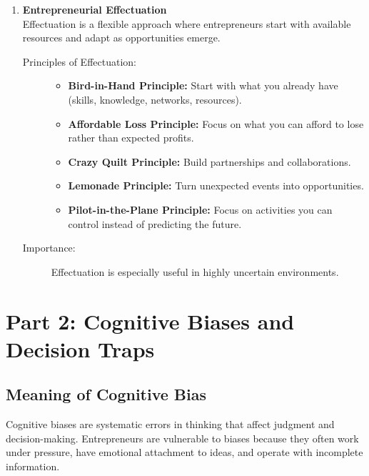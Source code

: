 \documentclass[12pt,a4paper]{article}
\begin{document}
\begin{enumerate}
    \item \textbf{Entrepreneurial Effectuation} \\
    Effectuation is a flexible approach where entrepreneurs start with available resources and adapt as opportunities emerge.
    \begin{description}
        \item[Principles of Effectuation:]
        \begin{itemize}
            \item \textbf{Bird-in-Hand Principle:} Start with what you already have (skills, knowledge, networks, resources).
            \item \textbf{Affordable Loss Principle:} Focus on what you can afford to lose rather than expected profits.
            \item \textbf{Crazy Quilt Principle:} Build partnerships and collaborations.
            \item \textbf{Lemonade Principle:} Turn unexpected events into opportunities.
            \item \textbf{Pilot-in-the-Plane Principle:} Focus on activities you can control instead of predicting the future.
        \end{itemize}
        \item[Importance:] Effectuation is especially useful in highly uncertain environments.
    \end{description}
\end{enumerate}

\section*{Part 2: Cognitive Biases and Decision Traps}

\subsection*{Meaning of Cognitive Bias}
Cognitive biases are systematic errors in thinking that affect judgment and decision-making. Entrepreneurs are vulnerable to biases because they often work under pressure, have emotional attachment to ideas, and operate with incomplete information.
\end{document}
